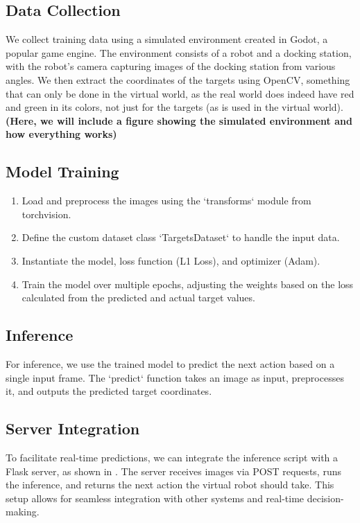 \documentclass[twocolumn]{article}
\begin{document}
\subsection{Data Collection}
We collect training data using a simulated environment created in Godot, a popular game engine. The environment consists of a robot and a docking station, with the robot's camera capturing images of the docking station from various angles. We then extract the coordinates of the targets using OpenCV, something that can only be done in the virtual world, as the real world does indeed have red and green in its colors, not just for the targets (as is used in the virtual world).
\textbf{(Here, we will include a figure showing the simulated environment and how everything works)}

\subsection{Model Training}
\begin{enumerate}
    \item Load and preprocess the images using the `transforms` module from torchvision.
    \item Define the custom dataset class `TargetsDataset` to handle the input data.
    \item Instantiate the model, loss function (L1 Loss), and optimizer (Adam).
    \item Train the model over multiple epochs, adjusting the weights based on the loss calculated from the predicted and actual target values.
\end{enumerate}

\subsection{Inference}
For inference, we use the trained model to predict the next action based on a single input frame. The `predict` function takes an image as input, preprocesses it, and outputs the predicted target coordinates.

\subsection{Server Integration}
To facilitate real-time predictions, we can integrate the inference script with a Flask server, as shown in . The server receives images via POST requests, runs the inference, and returns the next action the virtual robot should take. This setup allows for seamless integration with other systems and real-time decision-making.
\end{document}
